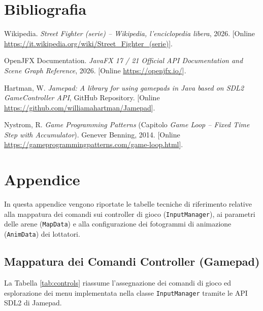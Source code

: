 \documentclass[11pt, a4paper]{article}
\begin{document}
\section{Bibliografia}
\begin{enumerate}[label={[\arabic*]}]
    \item Wikipedia. \emph{Street Fighter (serie) -- Wikipedia, l'enciclopedia libera}, 2026. [Online \url{https://it.wikipedia.org/wiki/Street_Fighter_(serie)}].
    \item OpenJFX Documentation. \emph{JavaFX 17 / 21 Official API Documentation and Scene Graph Reference}, 2026. [Online \url{https://openjfx.io/}].
    \item Hartman, W. \emph{Jamepad: A library for using gamepads in Java based on SDL2 GameController API}, GitHub Repository. [Online \url{https://github.com/williamahartman/Jamepad}].
    \item Nystrom, R. \emph{Game Programming Patterns} (Capitolo \emph{Game Loop -- Fixed Time Step with Accumulator}). Genever Benning, 2014. [Online \url{https://gameprogrammingpatterns.com/game-loop.html}].
\end{enumerate}

\newpage

\section{Appendice}
In questa appendice vengono riportate le tabelle tecniche di riferimento relative alla mappatura dei comandi sui controller di gioco (\texttt{InputManager}), ai parametri delle arene (\texttt{MapData}) e alla configurazione dei fotogrammi di animazione (\texttt{AnimData}) dei lottatori.

\subsection{Mappatura dei Comandi Controller (Gamepad)}
La Tabella \ref{tab:controls} riassume l'assegnazione dei comandi di gioco ed esplorazione dei menu implementata nella classe \texttt{InputManager} tramite le API SDL2 di Jamepad.
\end{document}
